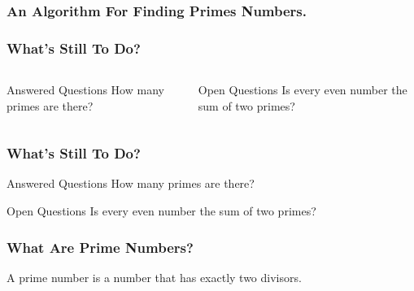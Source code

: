 \begin{frame}[fragile]
	\frametitle{An Algorithm For Finding Primes Numbers.}
	\begin{semiverbatim}
	\end{semiverbatim}
\end{frame}



\begin{frame}
	\frametitle{What's Still To Do?}
	\begin{columns}
\begin{block}{Answered Questions}
	How many primes are there?
\end{block}
\begin{block}{Open Questions}
	Is every even number the sum of two primes?
\end{block}
\end{columns}
\end{frame}



\begin{frame}
	\frametitle{What's Still To Do?}
	\begin{block}{Answered Questions}
		How many primes are there?
	\end{block}
	\begin{block}{Open Questions}
		Is every even number the sum of two primes?
	\end{block}
\end{frame}


\begin{frame}
	\frametitle{What Are Prime Numbers?}
	\begin{definition}
		A \alert{prime number} is a number that has exactly two divisors.
	\end{definition}
\end{frame}



